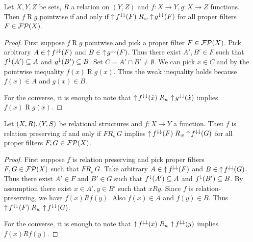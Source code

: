 \begin{proposition} \label{pointwisefunctionToFilterInequality}
Let $X,Y,Z$ be sets, $R$ a relation on $(Y,Z)$ and $f: X\to Y, g: X\to Z$ functions. Then $f\mathrel{R} g$ pointwise \textup{if and only if} $\operatorname{\uparrow} f^{\downarrow\downarrow}(F) \mathrel{R_w} \operatorname{\uparrow} g^{\downarrow\downarrow}(F)$ for all proper filters $F\in \operatorname{\mathcal{FP}}(X)$.
\end{proposition}
\begin{proof}
First suppose $f\mathrel{R} g$ pointwise and pick a proper filter $F\in \operatorname{\mathcal{FP}}(X)$. Pick arbitrary $A\in \operatorname{\uparrow} f^{\downarrow\downarrow}(F)$ and $B\in \operatorname{\uparrow} g^{\downarrow\downarrow}(F)$. Thus there exist $A',B'\in F$ such that $f^{\downarrow}(A')\subseteq A$ and $g^{\downarrow}(B')\subseteq B$. Set $C = A'\cap B' \neq \emptyset$. We can pick $x\in C$ and by the pointwise inequality $f(x) \mathrel{R} g(x)$. Thus the weak inequality holds because $f(x)\in A$ and $g(x)\in B$.

For the converse, it is enough to note that $\operatorname{\uparrow} f^{\downarrow\downarrow}(\dot{x}) \mathrel{R_w} \operatorname{\uparrow} g^{\downarrow\downarrow}(\dot{x})$ implies $f(x)\mathrel{R} g(x)$.
\end{proof}

\begin{proposition} \label{relationPreservingfunctionToFilterInequality}
Let $\sSet{X, R},\sSet{Y, S}$ be relational structures and $f: X\to Y$ a function. Then $f$ is relation preserving \textup{if and only if} $F\mathrel{R_w}G$ implies $\operatorname{\uparrow} f^{\downarrow\downarrow}(F) \mathrel{R_w} \operatorname{\uparrow} f^{\downarrow\downarrow}(G)$ for all proper filters $F, G\in \operatorname{\mathcal{FP}}(X)$.
\end{proposition}
\begin{proof}
First suppose $f$ is relation preserving and pick proper filters $F,G\in \operatorname{\mathcal{FP}}(X)$ such that $F\mathrel{R_w}G$. Take arbitrary $A\in \operatorname{\uparrow} f^{\downarrow\downarrow}(F)$ and $B\in \operatorname{\uparrow} f^{\downarrow\downarrow}(G)$. Thus there exist $A'\in F$ and $B'\in G$ such that $f^{\downarrow}(A')\subseteq A$ and $f^{\downarrow}(B')\subseteq B$. 
By assumption there exist $x\in A', y\in B'$ such that $xRy$. Since $f$ is relation-preserving, we have $f(x)Rf(y)$. Also $f(x)\in A$ and $f(y)\in B$. Thus $\operatorname{\uparrow} f^{\downarrow\downarrow}(F) \mathrel{R_w} \operatorname{\uparrow} f^{\downarrow\downarrow}(G)$.

For the converse, it is enough to note that $\operatorname{\uparrow} f^{\downarrow\downarrow}(\dot{x}) \mathrel{R_w} \operatorname{\uparrow} f^{\downarrow\downarrow}(\dot{y})$ implies $f(x)Rf(y)$.
\end{proof}

